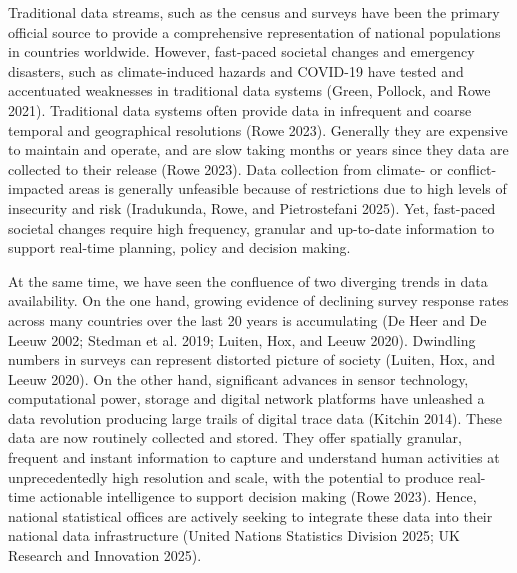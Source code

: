 \documentclass{article}
\begin{document}
Traditional data streams, such as the census and surveys have been the
primary official source to provide a comprehensive representation of
national populations in countries worldwide. However, fast-paced
societal changes and emergency disasters, such as climate-induced
hazards and COVID-19 have tested and accentuated weaknesses in
traditional data systems (Green, Pollock, and Rowe 2021). Traditional data systems often
provide data in infrequent and coarse temporal and geographical
resolutions (Rowe 2023). Generally they are expensive to maintain
and operate, and are slow taking months or years since they data are
collected to their release (Rowe 2023). Data collection from
climate- or conflict-impacted areas is generally unfeasible because of
restrictions due to high levels of insecurity and risk
(Iradukunda, Rowe, and Pietrostefani 2025). Yet, fast-paced societal changes require high
frequency, granular and up-to-date information to support real-time
planning, policy and decision making.

At the same time, we have seen the confluence of two diverging trends in
data availability. On the one hand, growing evidence of declining survey
response rates across many countries over the last 20 years is
accumulating (De Heer and De Leeuw 2002; Stedman et al. 2019; Luiten, Hox, and Leeuw 2020). Dwindling
numbers in surveys can represent distorted picture of society
(Luiten, Hox, and Leeuw 2020). On the other hand, significant advances in sensor
technology, computational power, storage and digital network platforms
have unleashed a data revolution producing large trails of digital trace
data (Kitchin 2014). These data are now routinely collected and
stored. They offer spatially granular, frequent and instant information
to capture and understand human activities at unprecedentedly high
resolution and scale, with the potential to produce real-time actionable
intelligence to support decision making (Rowe 2023). Hence,
national statistical offices are actively seeking to integrate these
data into their national data infrastructure (United Nations Statistics Division 2025; UK Research and Innovation 2025).
\end{document}
